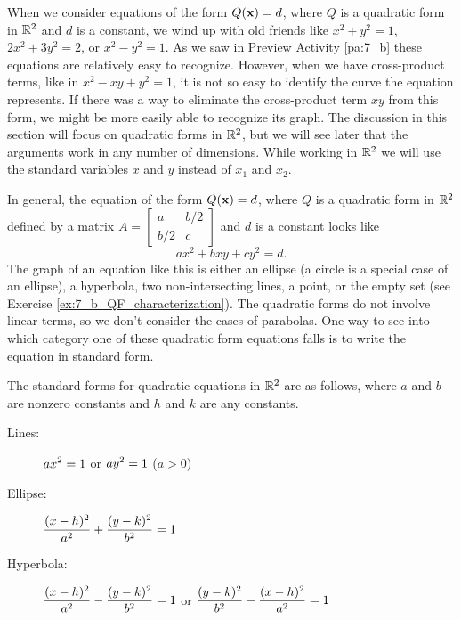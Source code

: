 
When we consider equations of the form $Q(\mathbf{x}) = d$, where $Q$ is a quadratic form in $\mathbb{R}^2$ and $d$ is a constant, we wind up with old friends like $x^2+y^2=1$, $2x^2+3y^2=2$, or $x^2-y^2=1$. As we saw in Preview Activity \ref{pa:7_b} these equations are relatively easy to recognize. However, when we have cross-product terms, like in $x^2-xy+y^2=1$, it is not so easy to identify the curve the equation represents. If there was a way to eliminate the cross-product term $xy$ from this form, we might be more easily able to recognize its graph. The discussion in this section will focus on quadratic forms in $\mathbb{R}^2$, but we will see later that the arguments work in any number of dimensions. While working in $\mathbb{R}^2$ we will use the standard variables $x$ and $y$ instead of $x_1$ and $x_2$.

In general, the equation of the form $Q(\mathbf{x}) = d$, where $Q$ is a quadratic form in $\mathbb{R}^2$ defined by a matrix $A = \left[ \begin{array}{cc} a&b/2\\b/2&c \end{array} \right] $ and $d$ is a constant looks like  
\[ax^2+bxy+cy^2 = d.\]
The graph of an equation like this is either an ellipse (a circle is a special case of an ellipse), a hyperbola, two non-intersecting lines, a point, or the empty set (see Exercise \ref{ex:7_b_QF_characterization}). The quadratic forms do not involve linear terms, so we don't consider the cases of parabolas. One way to see into which category one of these quadratic form equations falls is to write the equation in standard form.

The standard forms for quadratic equations in $\mathbb{R}^2$ are as follows, where $a$ and $b$ are nonzero constants and $h$ and $k$ are any constants.
\begin{description}
\item[Lines:] $\displaystyle ax^2 = 1$ or $\displaystyle ay^2=1$ ($a > 0$)
\item[Ellipse: ] $\displaystyle \frac{(x-h)^2}{a^2} + \frac{(y-k)^2}{b^2} = 1$
\item[Hyperbola: ] $\displaystyle \frac{(x-h)^2}{a^2} - \frac{(y-k)^2}{b^2} = 1$  or $\displaystyle \frac{(y-k)^2}{b^2} - \frac{(x-h)^2}{a^2} = 1$
\end{description}


